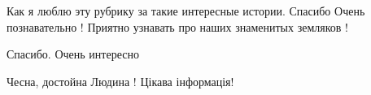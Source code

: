  
 
 
 
 

Как я люблю эту рубрику за такие интересные истории.
Спасибо
Очень познавательно !
Приятно узнавать про наших знаменитых земляков !

Спасибо. Очень интересно

Чесна, достойна Людина ! Цікава інформація!

